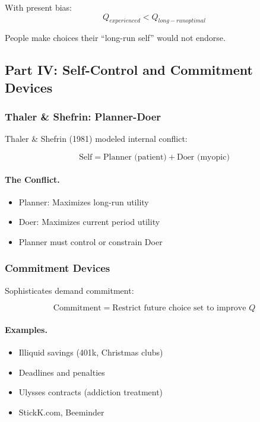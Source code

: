With present bias:
\begin{equation}
Q_{experienced} < Q_{long-run optimal}
\end{equation}

People make choices their ``long-run self'' would not endorse.

\subsection{Part IV: Self-Control and Commitment Devices}

\subsubsection{Thaler \& Shefrin: Planner-Doer}

Thaler \& Shefrin (1981) modeled internal conflict:

\begin{equation}
\boxed{
\text{Self} = \text{Planner (patient)} + \text{Doer (myopic)}
}
\label{eq:planner-doer}
\end{equation}

\paragraph{The Conflict.}
\begin{itemize}
    \item Planner: Maximizes long-run utility
    \item Doer: Maximizes current period utility
    \item Planner must control or constrain Doer
\end{itemize}

\subsubsection{Commitment Devices}

Sophisticates demand commitment:

\begin{equation}
\text{Commitment} = \text{Restrict future choice set to improve } Q
\end{equation}

\paragraph{Examples.}
\begin{itemize}
    \item Illiquid savings (401k, Christmas clubs)
    \item Deadlines and penalties
    \item Ulysses contracts (addiction treatment)
    \item StickK.com, Beeminder
\end{itemize}

